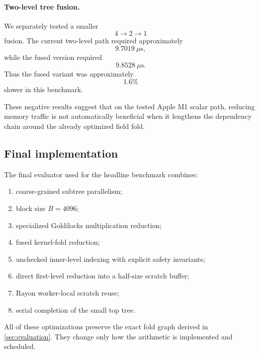 \paragraph{Two-level tree fusion.}
We separately tested a smaller
\[
4\to2\to1
\]
fusion.  The current two-level path required approximately
\[
9.7019\ \mu\mathrm{s},
\]
while the fused version required
\[
9.8528\ \mu\mathrm{s}.
\]
Thus the fused variant was approximately
\[
1.6\%
\]
slower in this benchmark.

These negative results suggest that on the tested Apple M1 scalar path,
reducing memory traffic is not automatically beneficial when it lengthens
the dependency chain around the already optimized field fold.

\subsection{Final implementation}

The final evaluator used for the headline benchmark combines:

\begin{enumerate}
    \item coarse-grained subtree parallelism;
    \item block size \(B=4096\);
    \item specialized Goldilocks multiplication reduction;
    \item fused kernel-fold reduction;
    \item unchecked inner-level indexing with explicit safety invariants;
    \item direct first-level reduction into a half-size scratch buffer;
    \item Rayon worker-local scratch reuse;
    \item serial completion of the small top tree.
\end{enumerate}

All of these optimizations preserve the exact fold graph derived in
\cref{sec:evaluation}.  They change only how the arithmetic is implemented
and scheduled.
